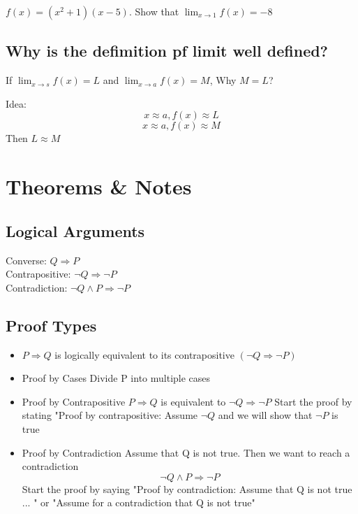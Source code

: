 \documentclass{report}
\begin{document}
     {
      $f(x) = (x^2+1)(x-5)$.  Show that $\lim_{x \to 1} f(x) = -8$
    }

    \subsection{Why is the defimition pf limit well defined?}%
    If $\lim_{x \to s} f(x) = L$ and $\lim_{x \to a} f(x) = M$, Why
    $M=L$?
      
    Idea:
      \[ x \approx a, f(x) \approx L \]
      \[ x \approx a, f(x) \approx M \]
      Then $L \approx M$

\newpage
\section*{Theorems \& Notes}%
    \subsection{Logical Arguments}%
    Converse: $Q \Longrightarrow P$ \\
    Contrapositive: $\neg Q \Longrightarrow \neg P$\\
    Contradiction: $ \neg Q \wedge P \Longrightarrow \neg P $

    \subsection{Proof Types}%
    \begin{itemize}
    \item $P \Longrightarrow Q$ is logically equivalent to its contrapositive $(\neg Q \Longrightarrow \neg P)$
    \item Proof by Cases
      Divide P into multiple cases
    \item Proof by Contrapositive
      $P \Longrightarrow Q $ is equivalent to $\neg Q \Longrightarrow \neg P$
      Start the proof by stating "Proof by contrapositive: Assume $\neg Q$
      and we will show that $\neg P$ is true

    \item Proof by Contradiction
      Assume that Q is not true.  Then we want to reach a contradiction
        \[ \neg Q \wedge P \Longrightarrow \neg P \]
      Start the proof by saying "Proof by contradiction:  Assume that
      Q is not true ... "  or "Assume for a contradiction that Q is not
      true"
    \end{itemize}
\end{document}
